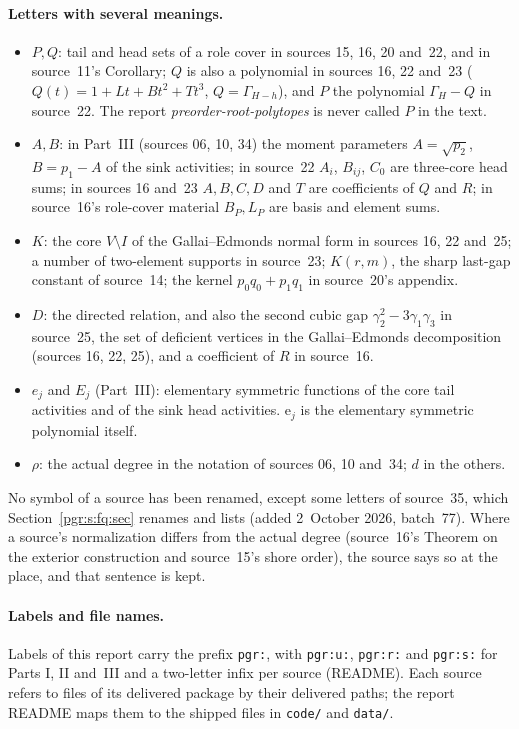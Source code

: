 \documentclass[11pt]{article}
\numberwithin{equation}{section}
\theoremstyle{definition}\newtheorem{definition}[theorem]{Definition}\newtheorem{remark}[theorem]{Remark}
\newcommand{\Ga}{\Gamma}                   %
\newcommand{\ee}{\mathrm e}                %
\newcommand{\prp}{\emph{preorder-root-polytopes}}
\begin{document}
\paragraph{Letters with several meanings.}
\begin{itemize}
\item $P,Q$: tail and head sets of a role cover in sources 15, 16, 20 and~22,
  and in source~11's Corollary; $Q$ is also a polynomial in sources 16,
  22 and~23 ($Q(t)=1+Lt+Bt^2+Tt^3$, $Q=\Ga_{H-h}$), and $P$ the
  polynomial $\Ga_H-Q$ in source~22. The report \prp{} is never called $P$
  in the text.
\item $A,B$: in Part~III (sources 06, 10, 34) the moment parameters
  $A=\sqrt{p_2}$, $B=p_1-A$ of the sink activities; in source~22 $A_i$,
  $B_{ij}$, $C_0$ are three-core head sums; in sources 16 and~23 $A,B,C,D$
  and $T$ are coefficients of $Q$ and $R$; in source~16's role-cover
  material $B_P,L_P$ are basis and element sums.
\item $K$: the core $V\setminus I$ of the Gallai--Edmonds normal form in
  sources 16, 22 and~25; a number of two-element supports in source~23;
  $K(r,m)$, the sharp last-gap constant of source~14; the kernel
  $p_0q_0+p_1q_1$ in source~20's appendix.
\item $D$: the directed relation, and also the second cubic gap
  $\gamma_2^2-3\gamma_1\gamma_3$ in source~25, the set of deficient
  vertices in the Gallai--Edmonds decomposition (sources 16, 22, 25), and
  a coefficient of $R$ in source~16.
\item $e_j$ and $E_j$ (Part~III): elementary symmetric functions of the core
  tail activities and of the sink head activities. $\ee_j$ is the
  elementary symmetric polynomial itself.
\item $\rho$: the actual degree in the notation of sources 06, 10 and~34;
  $d$ in the others.
\end{itemize}
No symbol of a source has been renamed, except some letters of
source~35, which Section~\ref{pgr:s:fq:sec} renames and lists (added
2~October 2026, batch~77). Where a source's normalization
differs from the actual degree (source~16's Theorem on the exterior
construction and source~15's shore order), the source says so at the
place, and that sentence is kept.

\paragraph{Labels and file names.} Labels of this report carry the prefix
\texttt{pgr:}, with \texttt{pgr:u:}, \texttt{pgr:r:} and \texttt{pgr:s:}
for Parts I, II and~III and a two-letter infix per source (README). Each
source refers to files of its delivered package by their delivered paths;
the report README maps them to the shipped files in \texttt{code/} and
\texttt{data/}.
\end{document}
